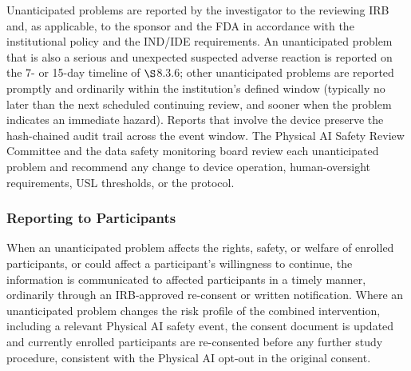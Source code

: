 Unanticipated problems are reported by the investigator to the reviewing IRB and, as
applicable, to the sponsor and the FDA in accordance with the institutional policy
and the IND/IDE requirements. An unanticipated problem that is also a serious and
unexpected suspected adverse reaction is reported on the 7- or 15-day timeline of
$\S$8.3.6; other unanticipated problems are reported promptly and ordinarily within
the institution's defined window (typically no later than the next scheduled
continuing review, and sooner when the problem indicates an immediate hazard).
Reports that involve the device preserve the hash-chained audit trail across the
event window. The Physical AI Safety Review Committee and the data safety monitoring
board review each unanticipated problem and recommend any change to device
operation, human-oversight requirements, USL thresholds, or the protocol.

\subsubsection{Reporting to Participants}

When an unanticipated problem affects the rights, safety, or welfare of enrolled
participants, or could affect a participant's willingness to continue, the
information is communicated to affected participants in a timely manner, ordinarily
through an IRB-approved re-consent or written notification. Where an unanticipated
problem changes the risk profile of the combined intervention, including a relevant
Physical AI safety event, the consent document is updated and currently enrolled
participants are re-consented before any further study procedure, consistent with the
Physical AI opt-out in the original consent.
